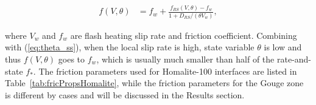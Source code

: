 \documentclass[final,a4paper]{elsarticle}
\begin{document}
\begin{align}
    f(V, \theta) &= f_w + \frac{f_{RS}(V, \theta) - f_w}{1 + D_{RS} / (\theta V_w)} \label{eq: flash_heating}, 
\end{align}

\noindent where $V_w$ and $f_w$ are flash heating slip rate and friction coefficient. 
Combining with (\ref{eq:theta_ss}), 
when the local slip rate is high, 
state variable $\theta$ is low and thus $f(V, \theta)$ goes to $f_w$, 
which is usually much smaller than half of the rate-and-state $f_*$. 
The friction parameters used for Homalite-100 interfaces are listed in Table~\ref{tab:fricPropsHomalite}, 
while the friction parameters for the Gouge zone is different by cases and will be discussed in the Results section.

\FloatBarrier
\end{document}
